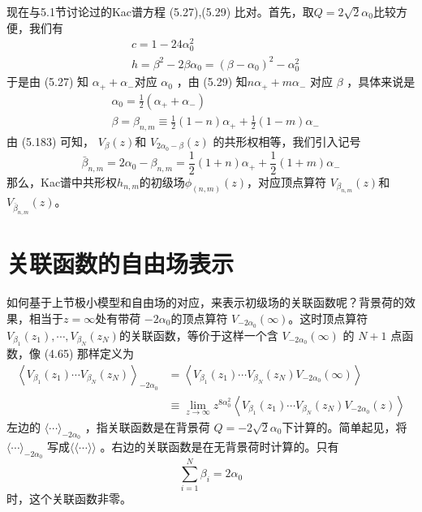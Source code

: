 现在与5.1节讨论过的Kac谱方程 (5.27),(5.29) 比对。首先，取$ Q=2 \sqrt{2} \alpha_{0} $比较方便，我们有
\begin{align} &c=1-24 \alpha_{0}^{2}\\ &h=\beta^{2}-2 \beta \alpha_{0}=\left(\beta-\alpha_{0}\right)^{2}-\alpha_{0}^{2} \end{align}
于是由 (5.27) 知 $\alpha_{+}+\alpha_{-} $对应 $\alpha_0$ ，由 (5.29) 知$ n \alpha_{+}+m \alpha_{-}$ 对应 $\beta$ ，具体来说是
\begin{align} &\alpha_{0}=\frac{1}{2}\left(\alpha_{+}+\alpha_{-}\right) \\ &\beta=\beta_{n, m} \equiv \frac{1}{2}(1-n) \alpha_{+}+\frac{1}{2}(1-m) \alpha_{-}\end{align}
由 (5.183) 可知， $V_{\beta}(z) $和 $V_{2 \alpha_{0}-\beta}(z)$ 的共形权相等，我们引入记号
\begin{equation}
	\bar{\beta}_{n, m}=2 \alpha_{0}-\beta_{n, m}=\frac{1}{2}(1+n) \alpha_{+}+\frac{1}{2}(1+m) \alpha_{-} 
\end{equation}
那么，Kac谱中共形权$h_{n,m}$的初级场$\phi_{(n, m)}(z) $，对应顶点算符 $V_{\beta_{n, m}}(z) $和$ V_{\bar{\beta}_{n, m}}(z) $。

\section{关联函数的自由场表示}
如何基于上节极小模型和自由场的对应，来表示初级场的关联函数呢？背景荷的效果，相当于$ z=\infty $处有带荷 $-2\alpha_0 $的顶点算符 $V_{-2 \alpha_{0}}(\infty) $。这时顶点算符 $V_{\beta_{1}}\left(z_{1}\right), \cdots, V_{\beta_{N}}\left(z_{N}\right) $的关联函数，等价于这样一个含 $V_{-2 \alpha_{0}}(\infty)$ 的 $N+1$ 点函数，像 (4.65) 那样定义为
\begin{equation}
	\begin{aligned} \left\langle V_{\beta_{1}}\left(z_{1}\right) \cdots V_{\beta_{N}}\left(z_{N}\right)\right\rangle_{-2 \alpha_{0}} &=\left\langle V_{\beta_{1}}\left(z_{1}\right) \cdots V_{\beta_{N}}\left(z_{N}\right) V_{-2 \alpha_{0}}(\infty)\right\rangle \\ & \equiv \lim _{z \rightarrow \infty} z^{8 \alpha_{0}^{2}}\left\langle V_{\beta_{1}}\left(z_{1}\right) \cdots V_{\beta_{N}}\left(z_{N}\right) V_{-2 \alpha_{0}}(z)\right\rangle \end{aligned} 
\end{equation}
左边的 $\langle\cdots\rangle_{-2 \alpha_{0}}$ ，指关联函数是在背景荷 $Q=-2 \sqrt{2} \alpha_{0} $下计算的。简单起见，将$ \langle\cdots\rangle_{-2 \alpha_{0}}$ 写成$ \langle\langle\cdots\rangle\rangle$ 。右边的关联函数是在无背景荷时计算的。只有
\begin{equation}
	\sum_{i=1}^{N} \beta_{i}=2 \alpha_{0} 
\end{equation}
时，这个关联函数非零。

